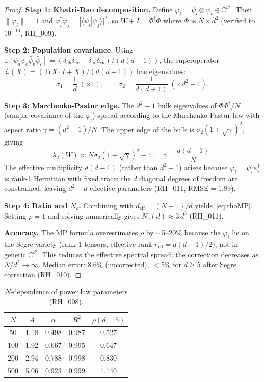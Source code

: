 \documentclass[12pt]{article}
\theoremstyle{definition}
\theoremstyle{remark}
\newcommand{\CC}{\mathbb{C}}
\newcommand{\Tr}{\mathrm{Tr}}
\begin{document}
\begin{proof}
\textbf{Step 1: Khatri-Rao decomposition.}
Define $\varphi_i = \psi_i \otimes \bar\psi_i \in \CC^{d^2}$.
Then $\|\varphi_i\| = 1$ and
$\varphi_i^\dagger \varphi_j = |\langle\psi_i|\psi_j\rangle|^2$,
so $W + I = \Phi^\dagger\Phi$ where $\Phi$ is $N \times d^2$
(verified to $10^{-16}$, RH\_009).

\textbf{Step 2: Population covariance.}
Using $\mathbb{E}[\psi_a \psi_e \bar\psi_b \bar\psi_c]
= (\delta_{ab}\delta_{ec} + \delta_{ac}\delta_{eb}) / (d(d{+}1))$,
the superoperator $\mathcal{L}(X) = (\Tr X \cdot I + X)/(d(d{+}1))$
has eigenvalues:
\begin{equation}\label{eq:pop}
\sigma_1 = \frac{1}{d} \;(\times 1),
\qquad
\sigma_2 = \frac{1}{d(d+1)} \;(\times d^2{-}1).
\end{equation}

\textbf{Step 3: Marchenko-Pastur edge.}
The $d^2{-}1$ bulk eigenvalues of $\Phi\Phi^\dagger/N$
(sample covariance of the $\varphi_i$)
spread according to the Marchenko-Pastur law with
aspect ratio $\gamma = (d^2{-}1)/N$.
The upper edge of the bulk is
$\sigma_2(1 + \sqrt\gamma)^2$, giving
\begin{equation}\label{eq:lam2}
\lambda_2(W) \approx N \sigma_2 (1 + \sqrt\gamma)^2 - 1\,,
\quad \gamma = \frac{d(d{-}1)}{N}\,.
\end{equation}
The effective multiplicity $d(d{-}1)$ (rather than $d^2{-}1$)
arises because $\varphi_i = \psi_i\psi_i^\dagger$
is rank-1 Hermitian with fixed trace:
the $d$ diagonal degrees of freedom are constrained,
leaving $d^2 - d$ effective parameters (RH\_011, RMSE${} = 1.89$).

\textbf{Step 4: Ratio and $N_c$.}
Combining with $d_{\mathrm{eff}} = (N{-}1)/d$ yields~\eqref{eq:rhoMP}.
Setting $\rho = 1$ and solving numerically gives
$N_c(d) \approx 3\,d^3$ (RH\_011).

\textbf{Accuracy.}
The MP formula overestimates $\rho$ by $\sim$5--20\%
because the $\varphi_i$ lie on the Segre variety
(rank-1 tensors, effective rank $r_{\mathrm{eff}} = d(d{+}1)/2$),
not in generic $\CC^{d^2}$.
This reduces the effective spectral spread; the correction
decreases as $N/d^2 \to \infty$.
Median error: 8.6\% (uncorrected), $<$5\% for $d \geq 5$
after Segre correction (RH\_010).
\end{proof}

\begin{table}[h]
\caption{$N$-dependence of power law parameters (RH\_008).}
\label{tab:Nalpha}
\centering
\begin{tabular}{ccccc}
\toprule
$N$ & $A$ & $\alpha$ & $R^2$ & $\rho(d{=}5)$ \\
\midrule
50  & 1.18 & 0.498 & 0.987 & 0.527 \\
100 & 1.92 & 0.667 & 0.995 & 0.647 \\
200 & 2.94 & 0.788 & 0.998 & 0.830 \\
500 & 5.06 & 0.923 & 0.999 & 1.140 \\
\bottomrule
\end{tabular}
\end{table}
\end{document}
